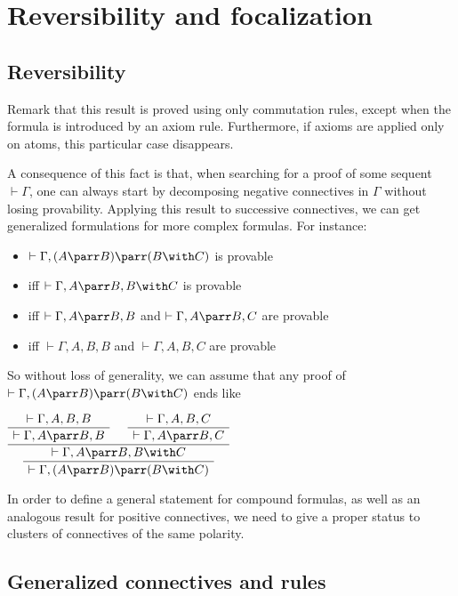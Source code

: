 \section{Reversibility and focalization}\label{reversibility-and-focalization}

\subsection{Reversibility}\label{reversibility}

Remark that this result is proved using only commutation rules, except
when the formula is introduced by an axiom rule. Furthermore, if axioms
are applied only on atoms, this particular case disappears.

A consequence of this fact is that, when searching for a proof of some
sequent \(\vdash\Gamma\), one can always start by decomposing negative
connectives in \(\Gamma\) without losing provability. Applying this
result to successive connectives, we can get generalized formulations
for more complex formulas. For instance:

\begin{itemize}
\tightlist
\item
  \(\vdash\Gamma,(A\parr B)\parr(B\with C)\) is provable
\item
  iff \(\vdash\Gamma,A\parr B,B\with C\) is provable
\item
  iff \(\vdash\Gamma,A\parr B,B\) and \(\vdash\Gamma,A\parr B,C\) are
  provable
\item
  iff \(\vdash\Gamma,A,B,B\) and \(\vdash\Gamma,A,B,C\) are provable
\end{itemize}

So without loss of generality, we can assume that any proof of
\(\vdash\Gamma,(A\parr B)\parr(B\with C)\) ends like

\(\AxRule{ \vdash \Gamma, A, B, B }
  \UnaRule{ \vdash \Gamma, A\parr B, B }
  \AxRule{ \vdash \Gamma, A, B, C }
  \UnaRule{ \vdash \Gamma, A\parr B, C }
  \BinRule{ \vdash \Gamma, A\parr B, B\with C }
  \UnaRule{ \vdash \Gamma, (A\parr B)\parr(B\with C) }
  \DisplayProof\)

In order to define a general statement for compound formulas, as well as
an analogous result for positive connectives, we need to give a proper
status to clusters of connectives of the same polarity.

\subsection{Generalized connectives and
rules}\label{generalized-connectives-and-rules}

